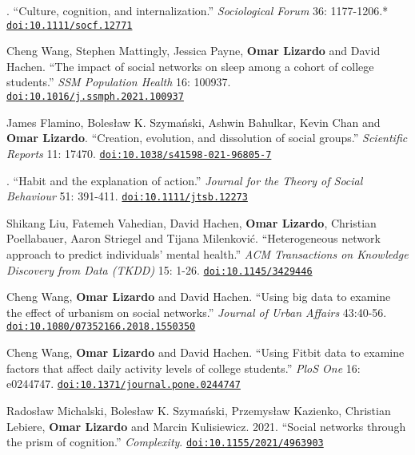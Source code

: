 
. ``Culture, cognition, and internalization.'' {\em Sociological Forum} 36: 1177-1206.\textcolor{uclablue}{*} \href{https://doi.org/10.1111/socf.12771}{\nolinkurl{doi:10.1111/socf.12771}}

\ind Cheng Wang, Stephen Mattingly, Jessica Payne, {\bf Omar Lizardo} and David Hachen. ``The impact of social networks on sleep among a cohort of college students.'' {\em SSM Population Health} 16: 100937. \newline \href{https://doi.org/10.1016/j.ssmph.2021.100937}{\nolinkurl{doi:10.1016/j.ssmph.2021.100937}} 

\ind James Flamino, Boles\l{}aw K. Szyma\'{n}ski, Ashwin Bahulkar, Kevin Chan and {\bf Omar Lizardo}. ``Creation, evolution, and dissolution of social groups.'' {\em Scientific Reports} 11: 17470. \newline \href{https://doi.org/10.1038/s41598-021-96805-7}{\nolinkurl{doi:10.1038/s41598-021-96805-7}} 

. ``Habit and the explanation of action.'' {\em Journal for the Theory of Social Behaviour} 51: 391-411. \href{https://doi.org/10.1111/jtsb.12273}{\nolinkurl{doi:10.1111/jtsb.12273}}

\ind Shikang Liu, Fatemeh Vahedian, David Hachen, {\bf Omar Lizardo}, Christian Poellabauer, Aaron Striegel and Tijana Milenkovi\'{c}. ``Heterogeneous network approach to predict individuals' mental health.'' {\em ACM Transactions on Knowledge Discovery from Data (TKDD)} 15: 1-26. \href{https://doi.org/10.1145/3429446}{\nolinkurl{doi:10.1145/3429446}}

\ind Cheng Wang, {\bf Omar Lizardo} and David Hachen. ``Using big data to examine the effect of urbanism on social networks.'' {\em Journal of Urban Affairs} 43:40-56. \href{https://doi.org/10.1080/07352166.2018.1550350}{\nolinkurl{doi:10.1080/07352166.2018.1550350}}

\ind Cheng Wang, {\bf Omar Lizardo} and David Hachen. ``Using Fitbit data to examine factors that affect daily activity levels of college students.'' {\em PloS One} 16: e0244747. \href{https://doi.org/10.1371/journal.pone.0244747}{\nolinkurl{doi:10.1371/journal.pone.0244747}}

\ind Rados\l{}aw Michalski, Boles\l{}aw K. Szyma\'{n}ski, Przemys\l{}aw Kazienko, Christian Lebiere, {\bf Omar Lizardo} and Marcin Kulisiewicz. 2021. ``Social networks through the prism of cognition.'' {\em Complexity}. \href{https://doi.org/10.1155/2021/4963903}{\nolinkurl{doi:10.1155/2021/4963903}}
\medskip









